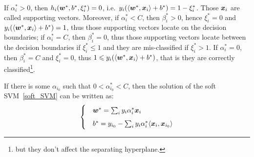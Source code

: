 If $\alpha_i^* > 0$, then $h_i(\boldsymbol{w}^*, b^*, \xi_i^*) = 0$, i.e.\ 
$y_i(\langle\boldsymbol{w}^*, \boldsymbol{x}_i\rangle + b^*) = 1 - \xi^*_i$. Those $\boldsymbol{x}_i$ are called supporting vectors. 
Moreover, if $\alpha^*_i < C$, then $\beta^*_i > 0$, hence $\xi^*_i = 0$ and
$y_i(\langle\boldsymbol{w}^*, \boldsymbol{x}_i\rangle + b^*) = 1$, thus those supporting vectors locate on the decision 
boundaries; if $\alpha^*_i = C$, then $\beta^*_i = 0$, thus those supporting vectors locate between the
decision boundaries if $\xi^*_i \leqslant 1$ and they are mis-classified if $\xi^*_i > 1$. If $\alpha^*_i = 0$,
then $\beta^*_i = C$ and $\xi^*_i = 0$, thus $1 \leqslant y_i(\langle\boldsymbol{w}^*, \boldsymbol{x}_i\rangle + b^*)$, that is 
they are correctly classified\footnote{but they don't affect the separating hyperplane.}.

If there is some $\alpha_{i_0}$ such that 
$0 < \alpha_{i_0}^* < C$, then the solution of the soft SVM~\eqref{soft_SVM} can be written as:
\begin{equation}
    \begin{cases}
        &\V{w}^* = \sum_i y_i \alpha^*_i \V{x}_i\vspace{5pt}\\
        &b^* = y_{i_0} - \sum_i y_i \alpha^*_i \langle \V{x}_i, \V{x}_{i_0}\rangle
    \end{cases}
\end{equation}

